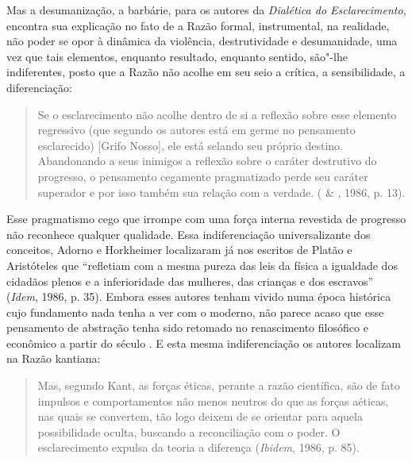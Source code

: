 Mas a desumanização, a barbárie, para os autores da \emph{Dialética do
Esclarecimento}, encontra sua explicação no fato de a Razão formal,
instrumental, na realidade, não poder se opor à dinâmica da violência,
destrutividade e desumanidade, uma vez que tais elementos, enquanto
resultado, enquanto sentido, são"-lhe indiferentes, posto que a Razão não
acolhe em seu seio a crítica, a sensibilidade, a diferenciação:

\begin{quote}
Se o esclarecimento não acolhe dentro de si a reflexão sobre esse
elemento regressivo (que segundo os autores está em germe no pensamento
esclarecido) [Grifo Nosso], ele está selando seu próprio destino.
Abandonando a seus inimigos a reflexão sobre o caráter destrutivo do
progresso, o pensamento cegamente pragmatizado perde seu caráter
superador e por isso também sua relação com a verdade. ( \&
, 1986, p. 13).
\end{quote}

Esse pragmatismo cego que irrompe com uma força interna revestida de
progresso não reconhece qualquer qualidade. Essa indiferenciação
universalizante dos conceitos, Adorno e Horkheimer localizaram já nos
escritos de Platão e Aristóteles que ``refletiam com a mesma pureza das
leis da física a igualdade dos cidadãos plenos e a inferioridade das
mulheres, das crianças e dos escravos'' (\emph{Idem}, 1986, p. 35).
Embora esses autores tenham vivido numa época histórica cujo fundamento
nada tenha a ver com o moderno, não parece acaso que esse pensamento de
abstração tenha sido retomado no renascimento filosófico e econômico a
partir do século . E esta mesma indiferenciação os autores localizam
na Razão kantiana:

\begin{quote}
Mas, segundo Kant, as forças éticas, perante a razão científica, são de
fato impulsos e comportamentos não menos neutros do que as forças
aéticas, nas quais se convertem, tão logo deixem de se orientar para
aquela possibilidade oculta, buscando a reconciliação com o poder. O
esclarecimento expulsa da teoria a diferença (\emph{Ibidem}, 1986, p.
85).
\end{quote}


